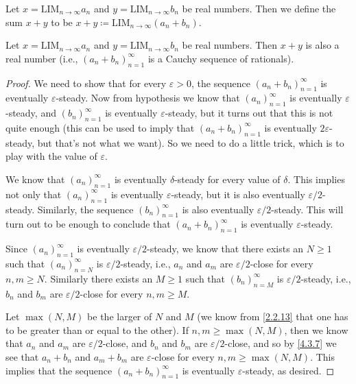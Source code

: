 \begin{defn}\label{5.3.4}
  Let \(x = \text{LIM}_{n \to \infty} a_n\) and \(y = \text{LIM}_{n \to \infty} b_n\) be real numbers.
  Then we define the sum \(x + y\) to be \(x + y \coloneqq \text{LIM}_{n \to \infty} (a_n + b_n)\).
\end{defn}

\setcounter{thm}{5}
\begin{lem}\label{5.3.6}
  Let \(x = \text{LIM}_{n \to \infty} a_n\) and \(y = \text{LIM}_{n \to \infty} b_n\) be real numbers.
  Then \(x + y\) is also a real number
  (i.e., \((a_n + b_n)_{n = 1}^{\infty}\) is a Cauchy sequence of rationals).
\end{lem}

\begin{proof}
  We need to show that for every \(\varepsilon > 0\), the sequence \((a_n + b_n)_{n = 1}^{\infty}\) is eventually \(\varepsilon\)-steady.
  Now from hypothesis we know that \((a_n)_{n = 1}^{\infty}\) is eventually \(\varepsilon\)-steady, and \((b_n)_{n = 1}^{\infty}\) is eventually \(\varepsilon\)-steady, but it turns out that this is not quite enough
  (this can be used to imply that \((a_n + b_n)_{n = 1}^{\infty}\) is eventually \(2\varepsilon\)-steady, but that's not what we want).
  So we need to do a little trick, which is to play with the value of \(\varepsilon\).

  We know that \((a_n)_{n = 1}^{\infty}\) is eventually \(\delta\)-steady for every value of \(\delta\).
  This implies not only that \((a_n)_{n = 1}^{\infty}\) is eventually \(\varepsilon\)-steady, but it is also eventually \(\varepsilon / 2\)-steady.
  Similarly, the sequence \((b_n)_{n = 1}^{\infty}\) is also eventually \(\varepsilon / 2\)-steady.
  This will turn out to be enough to conclude that \((a_n + b_n)_{n = 1}^{\infty}\) is eventually \(\varepsilon\)-steady.

  Since \((a_n)_{n = 1}^{\infty}\) is eventually \(\varepsilon / 2\)-steady, we know that there exists an \(N \geq 1\) such that \((a_n)_{n = N}^{\infty}\) is \(\varepsilon / 2\)-steady, i.e., \(a_n\) and \(a_m\) are \(\varepsilon / 2\)-close for every \(n, m \geq N\).
  Similarly there exists an \(M \geq 1\) such that \((b_n)_{n = M}^{\infty}\) is \(\varepsilon / 2\)-steady, i.e., \(b_n\) and \(b_m\) are \(\varepsilon / 2\)-close for every \(n, m \geq M\).

  Let \(\max(N, M)\) be the larger of \(N\) and \(M\)
  (we know from \cref{2.2.13} that one has to be greater than or equal to the other).
  If \(n, m \geq \max(N, M)\), then we know that \(a_n\) and \(a_m\) are \(\varepsilon / 2\)-close, and \(b_n\) and \(b_m\) are \(\varepsilon / 2\)-close, and so by \cref{4.3.7} we see that \(a_n + b_n\) and \(a_m + b_m\) are \(\varepsilon\)-close for every \(n, m \geq \max(N, M)\).
  This implies that the sequence \((a_n + b_n)_{n = 1}^{\infty}\) is eventually \(\varepsilon\)-steady, as desired.
\end{proof}

